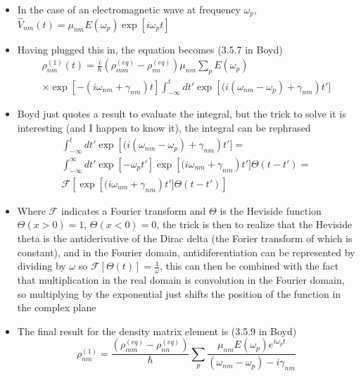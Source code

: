 \documentclass[english]{article}
\begin{document}
\begin{itemize}
\begin{align}
\exp\left[-(i\omega_{nm}+\gamma_{nm})t \right]\int_{-\infty}^tdt'\frac{-i}{\hbar}\left[\hat{V}(t'),\hat{\rho}^{(eq)}\right]_{nm}\exp\left[(i \omega_{nm}+\gamma_{nm}\right)t']
\end{align}
\item In the case of an electromagnetic wave at frequency $\omega_p$, \\$\hat{V}_{nm}(t)=\mu_{nm}E(\omega_p)\exp\left[i\omega_p t \right]$
\item Having plugged this in, the equation becomes (3.5.7 in Boyd)
\begin{align}
\rho^{(1)}_{nm}(t)=\frac{i}{\hbar}(\rho^{(eq)}_{mm}-\rho^{(eq)}_{nn})\mu_{nm}\sum_p E(\omega_p) \nonumber \\ \times\exp\left[-(i\omega_{nm}+\gamma_{nm})t \right]\int_{-\infty}^tdt'\exp\left[(i (\omega_{nm}-\omega_p)+\gamma_{nm}\right)t']
\end{align}
\item Boyd just quotes a result to evaluate the integral, but the trick to solve it is interesting (and I happen to know it), the integral can be rephrased
\begin{align}
\int_{-\infty}^tdt'\exp\left[(i (\omega_{nm}-\omega_p)+\gamma_{nm}\right)t']=\nonumber \\
\int_{-\infty}^{\infty}dt'\exp\left[-\omega_p t'\right]\exp\left[(i \omega_{nm}+\gamma_{nm}\right)t']\Theta(t-t')= \\
\mathcal{F}\left[ \exp\left[(i \omega_{nm}+\gamma_{nm}\right)t']\Theta(t-t') \right]
\end{align}
\item Where $\mathcal{F}$ indicates a Fourier transform and $\Theta$ is the Heviside function $\Theta(x>0)=1$, $\Theta(x<0)=0$, the trick is then to realize that the Heviside theta is the antiderivative of the Dirac delta (the Forier transform of which is constant), and in the Fourier domain, antidiferentiation can be represented by dividing by $\omega$ so $\mathcal{F}\left[ \Theta(t)\right]=\frac{1}{\omega}$,  this can then be combined with the fact that multiplication in the real domain is convolution in the Fourier domain, so multiplying by the exponential just shifts the position of the function in the complex plane
\item The final result for the density matrix element is (3.5.9 in Boyd)
\begin{equation}
\rho_{nm}^{(1)}=\frac{(\rho^{(eq)}_{mm}-\rho^{(eq)}_{nn})}{\hbar}\sum_p\frac{\mu_{nm}E(\omega_p)e^{i\omega_p t}}{(\omega_{nm}-\omega_p)-i\gamma_{nm}}

\end{equation}
\end{itemize}
\end{document}

